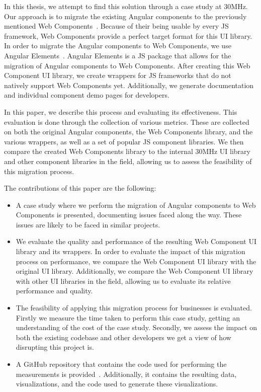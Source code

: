 In this thesis, we attempt to find this solution through a case study at 30MHz. Our approach is to migrate the existing Angular components to the previously mentioned Web Components~. Because of their being usable by every JS framework, Web Components provide a perfect target format for this UI library. In order to migrate the Angular components to Web Components, we use Angular Elements~. Angular Elements is a JS package that allows for the migration of Angular components to Web Components. After creating this Web Component UI library, we create wrappers for JS frameworks that do not natively support Web Components yet. Additionally, we generate documentation and individual component demo pages for developers.

In this paper, we describe this process and evaluating its effectiveness. This evaluation is done through the collection of various metrics. These are collected on both the original Angular components, the Web Components library, and the various wrappers, as well as a set of popular JS component libraries. We then compare the created Web Components library to the internal 30MHz UI library and other component libraries in the field, allowing us to assess the feasibility of this migration process.

The contributions of this paper are the following:

\begin{itemize}
	\item A case study where we perform the migration of Angular components to Web Components is presented, documenting issues faced along the way. These issues are likely to be faced in similar projects.
	\item We evaluate the quality and performance of the resulting Web Component UI library and its wrappers. In order to evaluate the impact of this migration process on performance, we compare the Web Component UI library with the original UI library. Additionally, we compare the Web Component UI library with other UI libraries in the field, allowing us to evaluate its relative performance and quality.
	\item The feasibility of applying this migration process for businesses is evaluated. Firstly we measure the time taken to perform this case study, getting an understanding of the cost of the case study. Secondly, we assess the impact on both the existing codebase and other developers we get a view of how disrupting this project is.
	\item A GitHub repository that contains the code used for performing the measurements is provided~. Additionally, it contains the resulting data, visualizations, and the code used to generate these visualizations.
\end{itemize}
